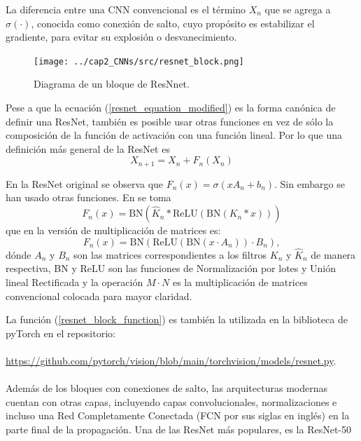 La diferencia entre una CNN convencional es el término $X_n$ que se agrega a $\sigma(\cdot)$, conocida como conexión de salto, cuyo propósito es estabilizar el gradiente, para evitar su explosión o desvanecimiento.

\begin{figure}[H]
    \centering
    
    \texttt{[image: ../cap2\_CNNs/src/resnet\_block.png]}
    \caption{Diagrama de un bloque de ResNnet.} 

\end{figure}

Pese a que la ecuación (\ref{resnet_equation_modified}) es la forma canónica de definir una ResNet, también es posible usar otras funciones en vez de sólo la composición de la función de activación con una función lineal. Por lo que una definición más general de la ResNet es
\begin{equation}
    X_{n+1} = X_n + F_n(X_n) 
\end{equation}

En la ResNet original se observa que $F_n(x) = \sigma(xA_n + b_n)$. Sin embargo se han usado otras funciones. En \cite{DBLP:journals/corr/abs-1806-03751} se toma 
\begin{equation}
    \label{resnet_block_function}
    F_n(x) = \text{BN}(\hat K_n *\text{ReLU}(\text{BN}(K_n * x)))
\end{equation}
que en la versión de multiplicación de matrices es:
\begin{equation}
    F_n(x) = \text{BN}(\text{ReLU}(\text{BN}(x \cdot A_n)) \cdot B_n),
\end{equation}
dónde $A_n$ y $B_n$ son las matrices correspondientes a los filtros $K_n$ y $\hat K_n$ de manera respectiva, BN y ReLU son las funciones de Normalización por lotes y Unión lineal Rectificada y la operación $M\cdot N$ es la multiplicación de matrices convencional colocada para mayor claridad.  

La función (\ref{resnet_block_function}) es también la utilizada en la biblioteca de pyTorch \cite{pytorch_library} en el repositorio:\\
\\
\url{https://github.com/pytorch/vision/blob/main/torchvision/models/resnet.py}. \\
\\
Además de los bloques con conexiones de salto, las arquitecturas modernas cuentan con otras capas, incluyendo capas convolucionales, normalizaciones e incluso una Red Completamente Conectada (FCN por sus siglas en inglés) en la parte final de la propagación. Una de las ResNet más populares, es la ResNet-50


